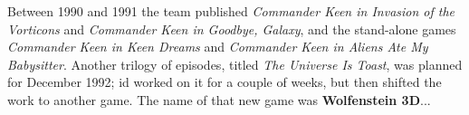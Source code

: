 \documentclass[book.tex]{subfiles}
\begin{document}
\par

Between 1990 and 1991 the team published \textit{Commander Keen in Invasion of the Vorticons} and \textit{Commander Keen in Goodbye, Galaxy}, and the stand-alone games \textit{Commander Keen in Keen Dreams} and \textit{Commander Keen in Aliens Ate My Babysitter}. Another trilogy of episodes, titled \textit{The Universe Is Toast}, was planned for December 1992; id worked on it for a couple of weeks, but then shifted the work to another game. The name of that new game was \textbf{Wolfenstein 3D}...
\end{document}
